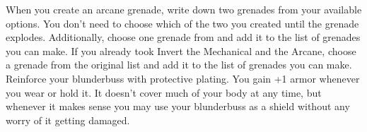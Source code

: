 \documentclass[darkmode]{dw_playbook}
\begin{document}
{        \gap
            {When you create an arcane grenade, write down two grenades from your available options.  You don’t need to choose which of the two you created until the grenade explodes.
            \gap
            Additionally, choose one grenade from  and add it to the list of grenades you can make.  If you already took Invert the Mechanical and the Arcane, choose a grenade from the original list and add it to the list of grenades you can make.}
        \gap
            {
            Reinforce your blunderbuss with protective plating.  You gain +1 armor whenever you wear or hold it.  It doesn’t cover much of your body at any time, but whenever it makes sense you may use your blunderbuss as a shield without any worry of it getting damaged.}
    }
    {
        ~
    }




\clearpage
~

\resourceLinks
    {
    }
\end{document}
